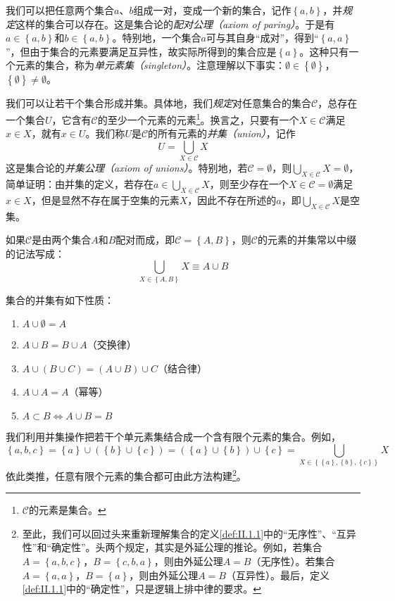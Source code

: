 \documentclass[../main.tex]{subfiles}
\begin{document}
我们可以把任意两个集合$a$、$b$组成一对，变成一个新的集合，记作$\left\{a,b\right\}$，并\emph{规定}这样的集合可以存在。这是集合论的\emph{配对公理（axiom of paring）}。于是有$a\in \left\{a,b\right\}$和$b\in \left\{a,b\right\}$。特别地，一个集合$a$可与其自身“成对”，得到“$\left\{a,a\right\}$”，但由于集合的元素要满足互异性，故实际所得到的集合应是$\left\{a\right\}$。这种只有一个元素的集合，称为\emph{单元素集（singleton）}。注意理解以下事实：$\emptyset\in\left\{\emptyset\right\}$，$\left\{\emptyset\right\}\neq\emptyset$。

我们可以让若干个集合形成并集。具体地，我们\emph{规定}对任意集合的集合$\mathcal{C}$，总存在一个集合$U$，它含有$\mathcal{C}$的至少一个元素的元素\footnote{$\mathcal{C}$的元素是集合。}。换言之，只要有一个$X\in\mathcal{C}$满足$x\in X$，就有$x\in U$。我们称$U$是$\mathcal{C}$的所有元素的\emph{并集（union）}，记作
\[
U=\bigcup_{X\in\mathcal{C}}X
\]
这是集合论的\emph{并集公理（axiom of unions）}。特别地，若$\mathcal{C}=\emptyset$，则$\bigcup_{X\in\mathcal{C}}X=\emptyset$，简单证明：由并集的定义，若存在$a\in\bigcup_{X\in\mathcal{C}}X$，则至少存在一个$X\in\mathcal{C}=\emptyset$满足$x\in X$，但是显然不存在属于空集的元素$X$，因此不存在所述的$a$，即$\bigcup_{X\in\mathcal{C}}X$是空集。

如果$\mathcal{C}$是由两个集合$A$和$B$配对而成，即$\mathcal{C}=\left\{A,B\right\}$，则$\mathcal{C}$的元素的并集常以中缀的记法写成：
\[
\bigcup_{X\in\left\{A,B\right\}}X\equiv A\cup B
\]

集合的并集有如下性质：

\begin{enumerate}
\item $A\cup \emptyset=A$
\item $A\cup B=B\cup A$（交换律）
\item $A\cup\left(B\cup C\right)=\left(A\cup B\right)\cup C$（结合律）
\item $A\cup A=A$（幂等）
\item $A\subset B\Leftrightarrow A\cup B=B$
\end{enumerate}

我们利用并集操作把若干个单元素集结合成一个含有限个元素的集合。例如，
\[
\left\{a,b,c\right\}=\left\{a\right\}\cup\left(\left\{b\right\}\cup\left\{c\right\}\right)=\left(\left\{a\right\}\cup\left\{b\right\}\right)\cup\left\{c\right\}=\bigcup_{X\in\left\{\left\{a\right\},\left\{b\right\},\left\{c\right\}\right\}}X
\]
依此类推，任意有限个元素的集合都可由此方法构建\footnote{至此，我们可以回过头来重新理解集合的定义\ref{def:II.1.1}中的“无序性”、“互异性”和“确定性”。头两个规定，其实是外延公理的推论。例如，若集合$A=\left\{a,b,c\right\}$，$B=\left\{c,b,a\right\}$，则由外延公理$A=B$（无序性）。若集合$A=\left\{a,a\right\}$，$B=\left\{a\right\}$，则由外延公理$A=B$（互异性）。最后，定义\ref{def:II.1.1}中的“确定性”，只是逻辑上排中律的要求。}。
\end{document}
